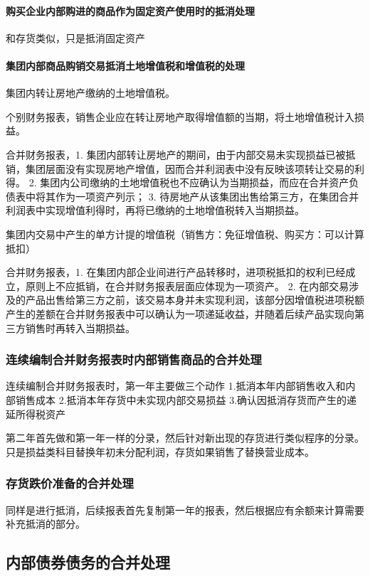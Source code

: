 \documentclass[UTF8,12pt]{ctexart}
\numberwithin{equation}{section} %
\numberwithin{figure}{section}
\numberwithin{table}{section}
\begin{document}
	\paragraph{购买企业内部购进的商品作为固定资产使用时的抵消处理}
	和存货类似，只是抵消固定资产
	
	\paragraph{集团内部商品购销交易抵消土地增值税和增值税的处理}
	集团内转让房地产缴纳的土地增值税。
	
	个别财务报表，销售企业应在转让房地产取得增值额的当期，将土地增值税计入损益。
	
	合并财务报表，1.	集团内部转让房地产的期间，由于内部交易未实现损益已被抵销，集团层面没有实现房地产增值，因而合并利润表中没有反映该项转让交易的利得。
	2.	集团内公司缴纳的土地增值税也不应确认为当期损益，而应在合并资产负债表中将其作为一项资产列示；
	3.	待房地产从该集团出售给第三方，在集团合并利润表中实现增值利得时，再将已缴纳的土地增值税转入当期损益。
	
	集团内交易中产生的单方计提的增值税（销售方：免征增值税、购买方：可以计算抵扣）
	
	合并财务报表，1.	在集团内部企业间进行产品转移时，进项税抵扣的权利已经成立，原则上不应抵销，在合并财务报表层面应体现为一项资产。
	2.	在内部交易涉及的产品出售给第三方之前，该交易本身并未实现利润，该部分因增值税进项税额产生的差额在合并财务报表中可以确认为一项递延收益，并随着后续产品实现向第三方销售时再转入当期损益。
	
	
	\subsubsection{连续编制合并财务报表时内部销售商品的合并处理}
	
	连续编制合并财务报表时，第一年主要做三个动作
	1.抵消本年内部销售收入和内部销售成本
	2.抵消本年存货中未实现内部交易损益
	3.确认因抵消存货而产生的递延所得税资产
	
	第二年首先做和第一年一样的分录，然后针对新出现的存货进行类似程序的分录。只是损益类科目替换年初未分配利润，存货如果销售了替换营业成本。
	
	
	\subsubsection{存货跌价准备的合并处理}
	同样是进行抵消，后续报表首先复制第一年的报表，然后根据应有余额来计算需要补充抵消的部分。
	
	\subsection{内部债券债务的合并处理}
\end{document}
